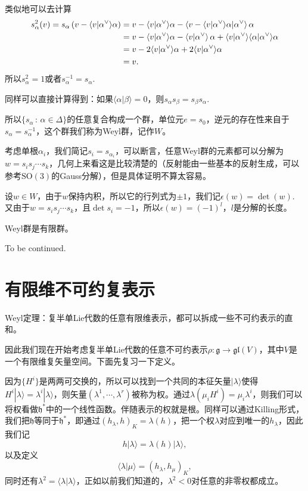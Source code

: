 \documentclass[9pt]{extarticle}
\newcommand{\lag}{{\mathfrak{g}}}
\begin{document}
\para 类似地可以去计算
\begin{align*}
	s_\alpha^2(v)=s_\alpha\left(v-\langle v|\alpha^\vee\rangle\alpha\right)&=v-\langle v|\alpha^\vee\rangle\alpha-\left\langle v-\langle v|\alpha^\vee\rangle\alpha\large|\alpha^\vee\right\rangle\alpha\\
	&=v-\langle v|\alpha^\vee\rangle\alpha-\left\langle v\large|\alpha^\vee\right\rangle\alpha+\langle v|\alpha^\vee\rangle\langle\alpha|\alpha^\vee\rangle\alpha\\
	&=v-2\langle v|\alpha^\vee\rangle\alpha+2\langle v|\alpha^\vee\rangle\alpha\\
	&=v.
\end{align*}
所以$s_\alpha^2=1$或者$s_\alpha^{-1}=s_\alpha$.

同样可以直接计算得到：如果$\langle \alpha|\beta\rangle=0$，则$s_\alpha s_\beta=s_\beta s_\alpha$.

\para 所以$\{s_\alpha\,:\, \alpha\in \Delta\}$的任意复合构成一个群，单位元$e=s_0$，逆元的存在性来自于$s_\alpha=s_\alpha^{-1}$，这个群我们称为Weyl群，记作$W$。

考虑单根$\alpha_i$，我们简记$s_i=s_{\alpha_i}$，可以断言，任意Weyl群的元素都可以分解为$w=s_is_j\cdots s_k$，几何上来看这是比较清楚的（反射能由一些基本的反射生成，可以参考$\mathrm{SO}(3)$的Gauss分解），但是具体证明不算太容易。

\para 设$w\in W$，由于$w$保持内积，所以它的行列式为$\pm 1$，我们记$\epsilon(w)=\det(w)$. 又由于$w=s_is_j\cdots s_k$，且$\det s_i=-1$，所以$\epsilon(w)=(-1)^l$，$l$是分解的长度。

\pro Weyl群是有限群。

To be continued.

\section{有限维不可约复表示}

\theo Weyl定理：复半单Lie代数的任意有限维表示，都可以拆成一些不可约表示的直和。

因此我们现在开始考虑复半单Lie代数的任意不可约表示$\rho:\lag\to \mathfrak{gl}(V)$，其中$V$是一个有限维复矢量空间。下面先复习一下定义。

\para 因为$\{H^i\}$是两两可交换的，所以可以找到一个共同的本征矢量$|\lambda\rangle$使得$H^i|\lambda\rangle=\lambda^i|\lambda\rangle$，则矢量$(\lambda^1,\cdots,\lambda^r)$被称为权。通过$\lambda(\mu_iH^i)=\mu_i\lambda^i$，则我们可以将权看做$\mathfrak{h}^*$中的一个线性函数。伴随表示的权就是根。同样可以通过Killing形式，我们把$\mathfrak{h}$等同于$\mathfrak{h}^*$，即通过$(h_\lambda,h)_K=\lambda(h)$，把一个权$\lambda$对应到唯一的$h_\lambda$，因此我们记
\[
	h|\lambda\rangle=\lambda(h)|\lambda\rangle,
\]
以及定义
\[
	\langle \lambda|\mu\rangle=(h_\lambda,h_\mu)_K,
\]
同时还有$\lambda^2=\langle \lambda|\lambda\rangle$，正如以前我们知道的，$\lambda^2<0$对任意的非零权都成立。
\end{document}
